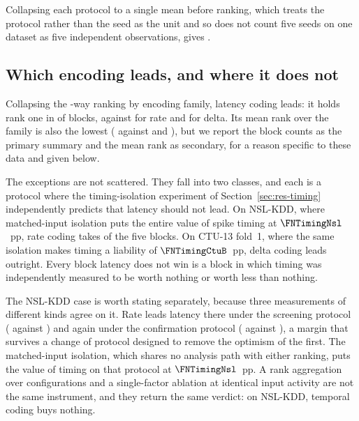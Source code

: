 Collapsing each protocol to a single mean before ranking, which treats the
protocol rather than the seed as the unit and so does not count five seeds on
one dataset as five independent observations, gives .

\subsection{Which encoding leads, and where it does not}
\label{sec:res-encoding}

Collapsing the \FNScrVariants{}-way ranking by encoding family, latency coding
leads: it holds rank one in  of  blocks, against  for rate
and  for delta. Its mean rank over the family is also the lowest
( against  and ), but we report the block counts as
the primary summary and the mean rank as secondary, for a reason specific to
these data and given below.

The exceptions are not scattered. They fall into two classes, and each is a
protocol where the timing-isolation experiment of
Section~\ref{sec:res-timing} independently predicts that latency should not
lead. On NSL-KDD, where matched-input isolation puts the entire value of spike
timing at $\FNTimingNsl$~pp, rate coding takes  of the five blocks. On
CTU-13 fold~1, where the same isolation makes timing a liability of
$\FNTimingCtuB$~pp, delta coding leads outright. Every block latency does not
win is a block in which timing was independently measured to be worth nothing
or worth less than nothing.

The NSL-KDD case is worth stating separately, because three measurements of
different kinds agree on it. Rate leads latency there under the screening
protocol ( against ) and again under the confirmation
protocol ( against ), a margin that survives a change of
protocol designed to remove the optimism of the first. The matched-input
isolation, which shares no analysis path with either ranking, puts the value of
timing on that protocol at $\FNTimingNsl$~pp. A rank aggregation over
\FNScrVariants{} configurations and a single-factor ablation at identical input
activity are not the same instrument, and they return the same verdict:
on NSL-KDD, temporal coding buys nothing.

